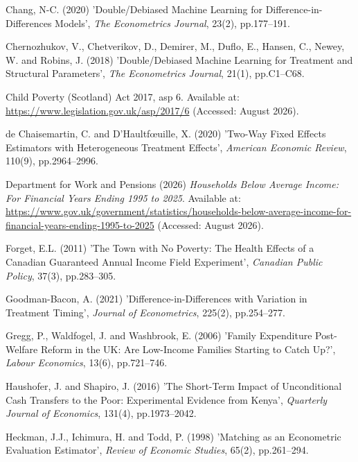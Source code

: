 \noindent\hangindent=1.27cm Chang, N-C. (2020) 'Double/Debiased Machine Learning for Difference-in-Differences Models', \textit{The Econometrics Journal}, 23(2), pp.177--191.
\medskip

\noindent\hangindent=1.27cm Chernozhukov, V., Chetverikov, D., Demirer, M., Duflo, E., Hansen, C., Newey, W. and Robins, J. (2018) 'Double/Debiased Machine Learning for Treatment and Structural Parameters', \textit{The Econometrics Journal}, 21(1), pp.C1--C68.
\medskip

\noindent\hangindent=1.27cm Child Poverty (Scotland) Act 2017, asp 6. Available at: \url{https://www.legislation.gov.uk/asp/2017/6} (Accessed: August 2026).
\medskip

\noindent\hangindent=1.27cm de Chaisemartin, C. and D'Haultf\oe uille, X. (2020) 'Two-Way Fixed Effects Estimators with Heterogeneous Treatment Effects', \textit{American Economic Review}, 110(9), pp.2964--2996.
\medskip

\noindent\hangindent=1.27cm Department for Work and Pensions (2026) \textit{Households Below Average Income: For Financial Years Ending 1995 to 2025}. Available at: \url{https://www.gov.uk/government/statistics/households-below-average-income-for-financial-years-ending-1995-to-2025} (Accessed: August 2026).
\medskip

\noindent\hangindent=1.27cm Forget, E.L. (2011) 'The Town with No Poverty: The Health Effects of a Canadian Guaranteed Annual Income Field Experiment', \textit{Canadian Public Policy}, 37(3), pp.283--305.
\medskip

\noindent\hangindent=1.27cm Goodman-Bacon, A. (2021) 'Difference-in-Differences with Variation in Treatment Timing', \textit{Journal of Econometrics}, 225(2), pp.254--277.
\medskip

\noindent\hangindent=1.27cm Gregg, P., Waldfogel, J. and Washbrook, E. (2006) 'Family Expenditure Post-Welfare Reform in the UK: Are Low-Income Families Starting to Catch Up?', \textit{Labour Economics}, 13(6), pp.721--746.
\medskip

\noindent\hangindent=1.27cm Haushofer, J. and Shapiro, J. (2016) 'The Short-Term Impact of Unconditional Cash Transfers to the Poor: Experimental Evidence from Kenya', \textit{Quarterly Journal of Economics}, 131(4), pp.1973--2042.
\medskip

\noindent\hangindent=1.27cm Heckman, J.J., Ichimura, H. and Todd, P. (1998) 'Matching as an Econometric Evaluation Estimator', \textit{Review of Economic Studies}, 65(2), pp.261--294.
\medskip

